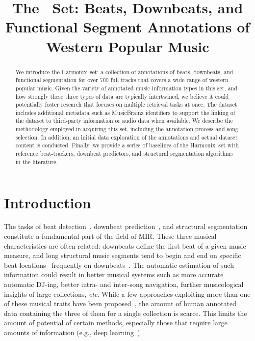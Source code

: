 \documentclass{article}
\title{The \setNameUpper~Set: Beats, Downbeats, and Functional Segment Annotations of Western Popular Music}
\newcommand{\setName}{Harmonix}
\begin{document}
%
\maketitle
%
\begin{abstract}
    We introduce the \setName~set: a collection of annotations of beats, downbeats, and functional segmentation for over 700 full tracks that covers a wide range of western popular music.
    Given the variety of annotated music information types in this set, and how strongly these three types of data are typically intertwined, we believe it could potentially foster research that focuses on multiple retrieval tasks at once.
    The dataset includes additional metadata such as MusicBrainz identifiers to support the linking of the dataset to third-party information or audio data when available.
    We describe the methodology employed in acquiring this set, including the annotation process and song selection. 
    In addition, an initial data exploration of the annotations and actual dataset content is conducted. 
    Finally, we provide a series of baselines of the \setName~set with reference beat-trackers, downbeat predictors, and structural segmentation algorithms in the literature.
\end{abstract}
%
\section{Introduction}\label{sec:introduction}

The tasks of beat detection~\cite{Ellis2007}, downbeat prediction~\cite{Bock2016}, and structural segmentation~\cite{Paulus2010} constitute a fundamental part of the field of MIR.
These three musical characteristics are often related: downbeats define the first beat of a given music measure, and long structural music segments tend to begin and end on specific beat locations --frequently on downbeats~\cite{Foote1999}.
The automatic estimation of such information could result in better musical systems such as more accurate automatic DJ-ing, better intra- and inter-song navigation, further musicological insights of large collections, \emph{etc}.
While a few approaches exploiting more than one of these musical traits have been proposed~\cite{Bock2016, Mccallum2019, Fuentes2019}, the amount of human annotated data containing the three of them for a single collection is scarce.
This limits the amount of potential of certain methods, especially those that require large amounts of information (e.g., deep learning~\cite{Humphrey2012}).
\end{document}

